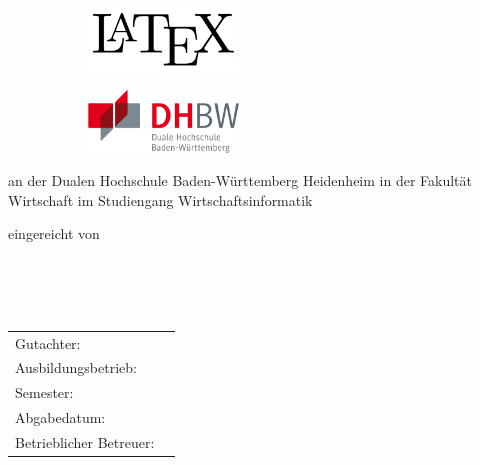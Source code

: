 \thispagestyle{empty}
\begin{center}
	
	\iflogosauftitelblatt
		\begin{figure}[h]
			\begin{subfigure}{0.5\textwidth}
				\centering
				\includegraphics[width=4cm, keepaspectratio]{./logos/unternehmen.png}
			\end{subfigure}
			\begin{subfigure}{0.5\textwidth}
				\centering
				\includegraphics[width=4cm, keepaspectratio]{./logos/dhbw.png}
			\end{subfigure}
		\end{figure}
	\fi

	\vspace*{\fill}
	
	\textbf{\large \titel}
	
	\vspace{\fill}
	
	\textbf{\arbeitstyp}
	
	an der Dualen Hochschule Baden-Württemberg Heidenheim in der Fakultät Wirtschaft im Studiengang Wirtschaftsinformatik \\
	
	\vspace{\fill}
	
	eingereicht von
		
	\autor \\
	\strasse{} \hausnummer \\
	\plz{} \ort \\
	
	\vspace{\fill}
	
	\begin{table}[b]
		\centering
		\begin{tabularx}{10cm}{lX}
			Gutachter: & \gutachter \\
			Ausbildungsbetrieb: & \ausbildungsbetrieb \newline \ausbildungsplz{} \ausbildungsort \\
			Semester: & \semester \\
			Abgabedatum: & \abgabedatum \\
			Betrieblicher Betreuer: & \betrieblicherbetreuer \\
		\end{tabularx}
	\end{table}
	
\end{center}